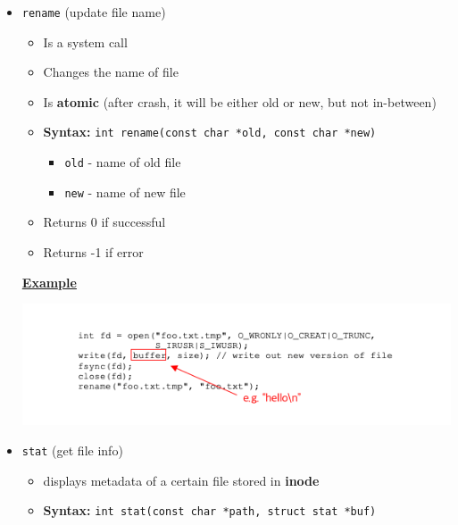 \documentclass[12pt]{article}
\begin{document}
\begin{enumerate}[1.]
\begin{enumerate}[a)]
\begin{itemize}
\begin{itemize}
                \item \texttt{rename} (update file name)

                \begin{itemize}
                    \item Is a system call
                    \item Changes the name of file
                    \item Is \textbf{atomic} (after crash, it will be either old or new, but not in-between)
                    \item \textbf{Syntax:} \texttt{int rename(const char *old, const char *new)}

                    \begin{itemize}
                        \item \texttt{old} - name of old file
                        \item \texttt{new} - name of new file
                    \end{itemize}

                    \item Returns 0 if successful
                    \item Returns -1 if error
                \end{itemize}

                \bigskip

                \underline{\textbf{Example}}

                \begin{center}
                \includegraphics[width=\linewidth]{../images/midterm_4_solution_8.png}
                \end{center}

                \item \texttt{stat} (get file info)

                \begin{itemize}
                    \item displays metadata of a certain file stored in \textbf{inode}
                    \item \textbf{Syntax:} \texttt{int stat(const char *path, struct stat *buf)}


\end{itemize}
\end{itemize}
\end{itemize}
\end{enumerate}
\end{enumerate}
\end{document}
